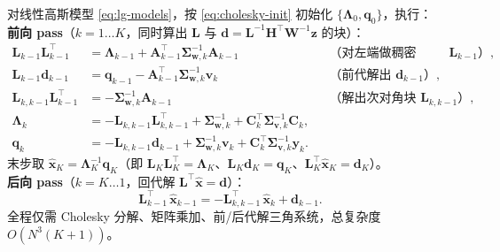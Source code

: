 \begin{algo}\label{alg:est-cholesky-smoother}
对线性高斯模型 \cref{eq:lg-models}，按 \cref{eq:cholesky-init} 初始化 $\{\boldsymbol{\Lambda}_0,\mathbf{q}_0\}$，执行：\\[2pt]
\textbf{前向 pass}（$k=1\dots K$，同时算出 $\mathbf{L}$ 与 $\mathbf{d}=\mathbf{L}^{-1}\mathbf{H}^\top\mathbf{W}^{-1}\mathbf{z}$ 的块）：
\begin{subequations}\label{eq:cholesky-forward}
\begin{align}
  \mathbf{L}_{k-1}\mathbf{L}_{k-1}^\top&=\boldsymbol{\Lambda}_{k-1}+\mathbf{A}_{k-1}^\top\boldsymbol{\Sigma}_{\mathbf{w},k}^{-1}\mathbf{A}_{k-1}
   &&\text{（对左端做稠密 Cholesky 得 }\mathbf{L}_{k-1}\text{）},\label{eq:chol-fwd-Lk}\\
  \mathbf{L}_{k-1}\mathbf{d}_{k-1}&=\mathbf{q}_{k-1}-\mathbf{A}_{k-1}^\top\boldsymbol{\Sigma}_{\mathbf{w},k}^{-1}\mathbf{v}_k
   &&\text{（前代解出 }\mathbf{d}_{k-1}\text{）},\label{eq:chol-fwd-dk}\\
  \mathbf{L}_{k,k-1}\mathbf{L}_{k-1}^\top&=-\boldsymbol{\Sigma}_{\mathbf{w},k}^{-1}\mathbf{A}_{k-1}
   &&\text{（解出次对角块 }\mathbf{L}_{k,k-1}\text{）},\label{eq:chol-fwd-Lsub}\\
  \boldsymbol{\Lambda}_k&=-\mathbf{L}_{k,k-1}\mathbf{L}_{k,k-1}^\top+\boldsymbol{\Sigma}_{\mathbf{w},k}^{-1}+\mathbf{C}_k^\top\boldsymbol{\Sigma}_{\mathbf{v},k}^{-1}\mathbf{C}_k,\label{eq:chol-fwd-info}\\
  \mathbf{q}_k&=-\mathbf{L}_{k,k-1}\mathbf{d}_{k-1}+\boldsymbol{\Sigma}_{\mathbf{w},k}^{-1}\mathbf{v}_k+\mathbf{C}_k^\top\boldsymbol{\Sigma}_{\mathbf{v},k}^{-1}\mathbf{y}_k.\label{eq:chol-fwd-q}
\end{align}
\end{subequations}
末步取 $\hat{\mathbf{x}}_K=\boldsymbol{\Lambda}_K^{-1}\mathbf{q}_K$（即 $\mathbf{L}_K\mathbf{L}_K^\top=\boldsymbol{\Lambda}_K$、$\mathbf{L}_K\mathbf{d}_K=\mathbf{q}_K$、$\mathbf{L}_K^\top\hat{\mathbf{x}}_K=\mathbf{d}_K$）。\\[2pt]
\textbf{后向 pass}（$k=K\dots 1$，回代解 $\mathbf{L}^\top\hat{\mathbf{x}}=\mathbf{d}$）：
\begin{equation}
  \mathbf{L}_{k-1}^\top\,\hat{\mathbf{x}}_{k-1}=-\mathbf{L}_{k,k-1}^\top\,\hat{\mathbf{x}}_k+\mathbf{d}_{k-1}.
  \label{eq:cholesky-backward}
\end{equation}
全程仅需 Cholesky 分解、矩阵乘加、前/后代解三角系统，总复杂度 $O(N^3(K+1))$。
\end{algo}

